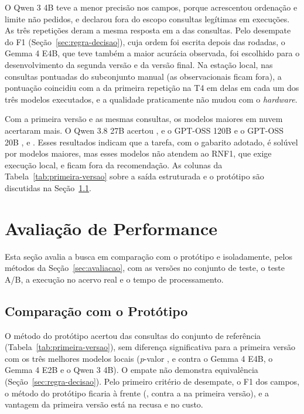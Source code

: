 O Qwen 3 4B teve a menor precisão nos campos, porque acrescentou ordenação e limite não pedidos, e declarou fora do escopo consultas legítimas em  execuções. As três repetições deram a mesma resposta em  a  das  consultas. Pelo desempate do F1 (Seção~\ref{sec:regra-decisao}), cuja ordem foi escrita depois das rodadas, o Gemma 4 E4B, que teve também a maior acurácia observada, foi escolhido para o desenvolvimento da segunda versão e da versão final. Na estação local, nas  consultas pontuadas do subconjunto manual (as observacionais ficam fora), a pontuação coincidiu com a da primeira repetição na T4 em  delas em cada um dos três modelos executados, e a qualidade praticamente não mudou com o \textit{hardware}.

Com a primeira versão e as mesmas consultas, os modelos maiores em nuvem acertaram mais. O Qwen 3.8 27B \cite{qwen2026qwen38} acertou , e o GPT-OSS 120B e o GPT-OSS 20B \cite{openai2025gptoss},  e . Esses resultados indicam que a tarefa, com o gabarito adotado, é solúvel por modelos maiores, mas esses modelos não atendem ao RNF1, que exige execução local, e ficam fora da recomendação. As colunas da Tabela~\ref{tab:primeira-versao} sobre a saída estruturada e o protótipo são discutidas na Seção~\ref{sec:res-prototipo}.

\section{Avaliação de Performance}
\label{sec:res-performance}

Esta seção avalia a busca em comparação com o protótipo e isoladamente, pelos métodos da Seção~\ref{sec:avaliacao}, com as versões no conjunto de teste, o teste A/B, a execução no acervo real e o tempo de processamento.

\subsection{Comparação com o Protótipo}
\label{sec:res-prototipo}

O método do protótipo acertou  das consultas do conjunto de referência (Tabela~\ref{tab:primeira-versao}), sem diferença significativa para a primeira versão com os três melhores modelos locais (\textit{p}-valor ,  e  contra o Gemma 4 E4B, o Gemma 4 E2B e o Qwen 3 4B). O empate não demonstra equivalência (Seção~\ref{sec:regra-decisao}). Pelo primeiro critério de desempate, o F1 dos campos, o método do protótipo ficaria à frente (, contra  a  na primeira versão), e a vantagem da primeira versão está na recusa e no custo.

